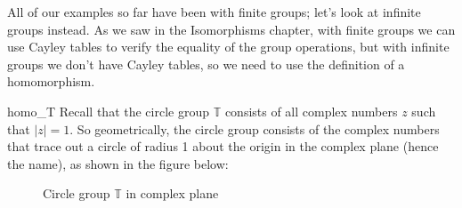  All of our examples so far have been with finite groups; let's look at infinite groups instead.  As we saw in the Isomorphisms chapter, with finite groups we can use Cayley tables to verify the equality of the group operations, but with infinite groups we don't have  Cayley tables, so we need to use  the definition of a homomorphism.

\begin{example}{homo_T}
Recall that the circle group ${ \mathbb T}$ consists of all complex numbers $z$ such that $|z|=1$. So geometrically, the circle group consists of the complex numbers that trace out a circle of radius 1 about the origin in the complex plane (hence the name), as shown in the figure below:

\begin{figure}[hbt]
\begin{center}

\end{center}
\caption{Circle group ${ \mathbb T}$ in complex plane}
\label{fig:circleGroup}
\end{figure}


\end{example}
